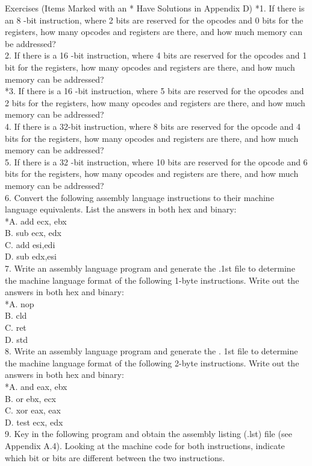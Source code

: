 \documentclass[10pt]{book}
\begin{document}
Exercises (Items Marked with an * Have Solutions in Appendix D)
*1. If there is an 8 -bit instruction, where 2 bits are reserved for the opcodes and 0 bits for the registers, how many opcodes and registers are there, and how much memory can be addressed?\\
2. If there is a 16 -bit instruction, where 4 bits are reserved for the opcodes and 1 bit for the registers, how many opcodes and registers are there, and how much memory can be addressed?\\
*3. If there is a 16 -bit instruction, where 5 bits are reserved for the opcodes and 2 bits for the registers, how many opcodes and registers are there, and how much memory can be addressed?\\
4. If there is a 32-bit instruction, where 8 bits are reserved for the opcode and 4 bits for the registers, how many opcodes and registers are there, and how much memory can be addressed?\\
5. If there is a 32 -bit instruction, where 10 bits are reserved for the opcode and 6 bits for the registers, how many opcodes and registers are there, and how much memory can be addressed?\\
6. Convert the following assembly language instructions to their machine language equivalents. List the answers in both hex and binary:\\
*A. add ecx, ebx\\
B. sub ecx, edx\\
C. add esi,edi\\
D. sub edx,esi\\
7. Write an assembly language program and generate the .1st file to determine the machine language format of the following 1-byte instructions. Write out the answers in both hex and binary:\\
*A. nop\\
B. cld\\
C. ret\\
D. std\\
8. Write an assembly language program and generate the . 1st file to determine the machine language format of the following 2-byte instructions. Write out the answers in both hex and binary:\\
*A. and eax, ebx\\
B. or ebx, ecx\\
C. xor eax, eax\\
D. test ecx, edx\\
9. Key in the following program and obtain the assembly listing (.lst) file (see Appendix A.4). Looking at the machine code for both instructions, indicate which bit or bits are different between the two instructions.
\end{document}
